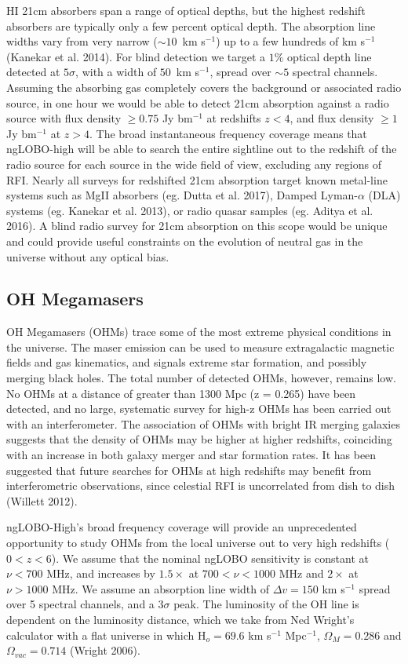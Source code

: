 \documentclass[11pt]{article}
\begin{document}
HI 21cm absorbers span a range of optical depths, but the highest redshift absorbers are typically only a few percent optical depth. The absorption line widths vary from very narrow ($\sim 10$~km s$^{-1}$) up to a few hundreds of km s$^{-1}$ (Kanekar et al. 2014).   For blind detection we target a $1\%$ optical depth line detected at $5\sigma$, with a width of $50$~km s$^{-1}$, spread over $\sim 5$ spectral channels.  Assuming the absorbing gas completely covers the background or associated radio source, in one hour we would be able to detect 21cm absorption against a radio source with flux density $\geq 0.75$ Jy bm$^{-1}$ at redshifts $z < 4$, and flux density $ \geq 1$ Jy bm$^{-1}$ at $z > 4$.  The broad instantaneous frequency coverage means that ngLOBO-high will be able to search the entire sightline out to the redshift of the radio source for each source in the wide field of view, excluding any regions of RFI.  Nearly all surveys for redshifted 21cm absorption target known metal-line systems such as MgII absorbers (eg. Dutta et al. 2017), Damped Lyman-$\alpha$ (DLA) systems (eg. Kanekar et al. 2013), or radio quasar samples (eg. Aditya et al. 2016). A blind radio survey for 21cm absorption on this scope would be unique and could provide useful constraints on the evolution of neutral gas in the universe without any optical bias. 


\subsection{OH Megamasers}

OH Megamasers (OHMs) trace some of the most extreme physical conditions in the universe. The maser emission can be used to measure extragalactic magnetic fields and gas kinematics, and signals extreme star formation, and possibly merging black holes. The total number of detected OHMs, however, remains low. No OHMs at a distance of greater than 1300 Mpc (z = 0.265) have been detected, and no large, systematic survey for high-z OHMs has been carried out with an interferometer. The association of OHMs with bright IR merging galaxies suggests that the density of OHMs may be higher at higher redshifts, coinciding with an increase in both galaxy merger and star formation rates. It has been suggested that future searches for OHMs at high redshifts may benefit from interferometric observations, since celestial
RFI is uncorrelated from dish to dish (Willett 2012). 

ngLOBO-High's broad frequency coverage will provide an unprecedented opportunity to study OHMs from the local universe out to very high redshifts ($0 < z < 6$).  We assume that the nominal ngLOBO sensitivity is constant at $\nu < 700$ MHz, and increases by $1.5\times$ at $700 < \nu < 1000$ MHz and $2\times$ at $\nu > 1000$ MHz.  We assume an absorption line width of $\Delta v = 150$ km s$^{-1}$ spread over 5 spectral channels, and a $3\sigma$ peak.  The luminosity of the OH line is dependent on the luminosity distance, which we take from Ned Wright's calculator with a flat universe in which H$_o = 69.6$ km s$^{-1}$ Mpc$^{-1}$, $\Omega_{M} = 0.286$ and $\Omega_{vac} = 0.714$ (Wright 2006).    
\end{document}

